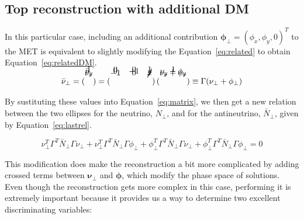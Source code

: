 \documentclass[a4paper, 10pt, openright]{report}
\begin{document}
\subsection{Top reconstruction with additional \ac{DM}} \label{section:ttrecoDM}

In this particular case, including an additional contribution $\bm{\phi_\perp} = (\phi_x, \phi_y, 0)^T$ to the \ac{MET} is equivalent to slightly modifying the Equation~\ref{eq:related} to obtain Equation~\ref{eq:relatedDM}.

\begin{equation}
\label{eq:relatedDM}
\bar \nu_\perp = \begin{pmatrix}
\\[-1.3cm] \bar \nu_x \\[-0.5cm]
\bar \nu_y \\[-0.5cm]
1
\end{pmatrix} = \begin{pmatrix}
\\[-1.3cm] -1 & 0 & \cancel{x} \\[-0.5cm]
0 & -1 & \cancel{y} \\[-0.5cm]
0 & 0 & 1
\end{pmatrix} \begin{pmatrix}
\\[-1.3cm] \nu_x + \phi_x \\[-0.5cm]
\nu_y + \phi_y \\[-0.5cm]
1
\end{pmatrix} \equiv \Gamma (\nu_\perp + \phi_\perp)
\end{equation}

By sustituting these values into Equation~\ref{eq:matrix}, we then get a new relation between the two ellipses for the neutrino, $N_\perp$, and for the antineutrino, $\bar N_\perp$, given by Equation~\ref{eq:lastrel}.

 \begin{equation}
\label{eq:lastrel}
\nu_\perp^T \Gamma^T \bar N_\perp \Gamma \nu_\perp + \nu_\perp^T \Gamma^T \bar N_\perp \Gamma \phi_\perp + \phi_\perp^T \Gamma^T \bar N_\perp \Gamma \nu_\perp + \phi_\perp^T \Gamma^T \bar N_\perp \Gamma \phi_\perp = 0
\end{equation}

This modification does make the reconstruction a bit more complicated by adding crossed terms between $\bm{\nu_\perp}$ and $\bm{\phi}$, which modify the phase space of solutions. Even though the reconstruction gets more complex in this case, performing it is extremely important because it provides us a way to determine two excellent discriminating variables:
\end{document}
